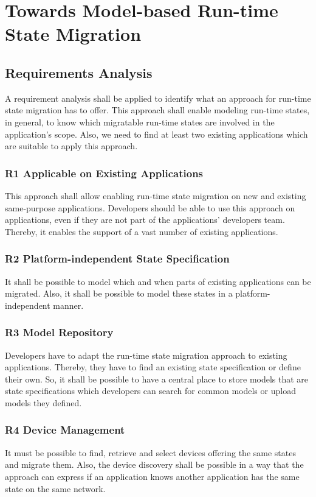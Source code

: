 \chapter{Towards Model-based Run-time State Migration}
\label{ch:requirements}

\section{Requirements Analysis}

A requirement analysis shall be applied to identify what an approach for run-time state migration has to offer. This approach shall enable modeling run-time states, in general, to know which migratable run-time states are involved in the application's scope. Also, we need to find at least two existing applications which are suitable to apply this approach.

\subsection{R1 Applicable on Existing Applications}
This approach shall allow enabling run-time state migration on new and existing same-purpose applications. Developers should be able to use this approach on applications, even if they are not part of the applications' developers team. Thereby, it enables the support of a vast number of existing applications.


\subsection{R2 Platform-independent State Specification}
It shall be possible to model which and when parts of existing applications can be migrated. Also, it shall be possible to model these states in a platform-independent manner.

\subsection{R3 Model Repository}
Developers have to adapt the run-time state migration approach to existing applications. Thereby, they have to find an existing state specification or define their own. So, it shall be possible to have a central place to store models that are state specifications which developers can search for common models or upload models they defined.

\subsection{R4 Device Management}
It must be possible to find, retrieve and select devices offering the same states and migrate them. Also, the device discovery shall be possible in a way that the approach can express if an application knows another application has the same state on the same network.



